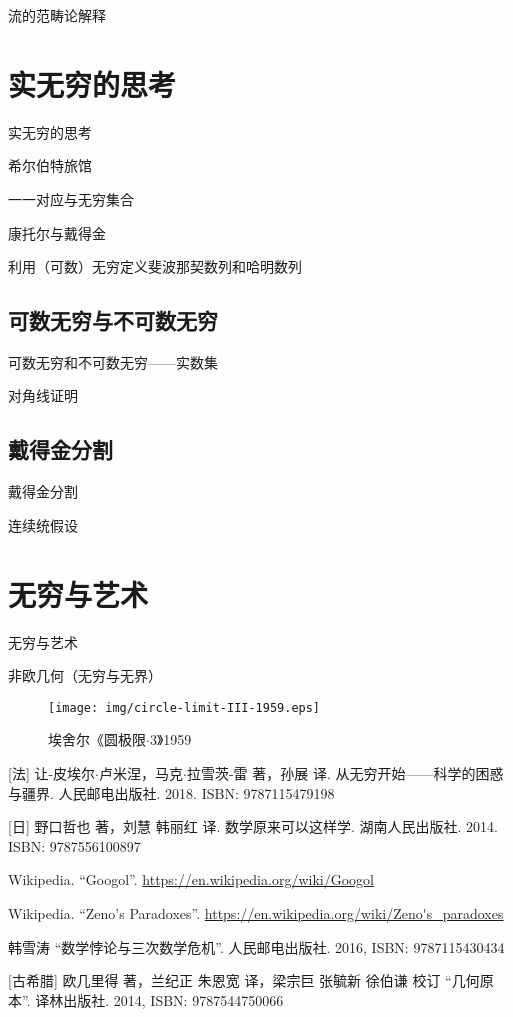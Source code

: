 \documentclass{article}
\begin{document}
流的范畴论解释

\section{实无穷的思考}
实无穷的思考

希尔伯特旅馆

一一对应与无穷集合

康托尔与戴得金

利用（可数）无穷定义斐波那契数列和哈明数列

\subsection{可数无穷与不可数无穷}
可数无穷和不可数无穷——实数集

对角线证明

\subsection{戴得金分割}
戴得金分割

连续统假设

\section{无穷与艺术}
无穷与艺术

非欧几何（无穷与无界）

\begin{wrapfigure}{L}{0.4\textwidth}
 \centering
 \texttt{[image: img/circle-limit-III-1959.eps]}
 \captionsetup{labelformat=empty}
 \caption{埃舍尔《圆极限$\cdot$3》1959}
 \label{fig:Penrose-triangle}
\end{wrapfigure}


\ifx\wholebook\relax \else
\begin{thebibliography}{99}

[法] 让-皮埃尔$\cdot$卢米涅，马克$\cdot$拉雪茨-雷 著，孙展 译. 从无穷开始——科学的困惑与疆界. 人民邮电出版社. 2018. ISBN: 9787115479198

[日] 野口哲也 著，刘慧 韩丽红 译. 数学原来可以这样学. 湖南人民出版社. 2014. ISBN: 9787556100897

Wikipedia. ``Googol''. \url{https://en.wikipedia.org/wiki/Googol}

Wikipedia. ``Zeno's Paradoxes''. \url{https://en.wikipedia.org/wiki/Zeno's_paradoxes}

韩雪涛 ``数学悖论与三次数学危机''. 人民邮电出版社. 2016, ISBN: 9787115430434

[古希腊] 欧几里得 著，兰纪正 朱恩宽 译，梁宗巨 张毓新 徐伯谦 校订 ``几何原本''. 译林出版社. 2014, ISBN: 9787544750066

\end{thebibliography}

\expandafter\enddocument

\fi
\end{document}
